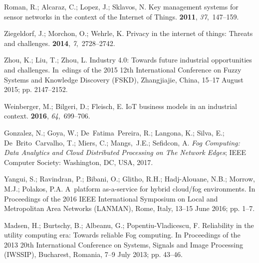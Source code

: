 \documentclass[symmetry,article,accept,moreauthors,pdftex10pt,a4paper]{mdpi}
\begin{document}
\begin{thebibliography}{999}
Roman, R.; Alcaraz, C.; Lopez, J.; Sklavos, N.
\newblock Key management systems for sensor networks in the context of the
Internet of Things.
 {\bf 2011}, {\em 37},~147--159.

Ziegeldorf, J.; Morchon, O.; Wehrle, K.
\newblock Privacy in the internet of things: Threats and challenges.
 {\bf 2014}, {\em
	7},~2728--2742.

Zhou, K.; Liu, T.; Zhou, L.
\newblock Industry 4.0: Towards future industrial opportunities and challenges.
\newblock In~edings of the 2015 12th International Conference on Fuzzy Systems and Knowledge
Discovery (FSKD),  Zhangjiajie, China, 15--17 August 2015; pp. 2147--2152.

Weinberger, M.; Bilgeri, D.; Fleisch, E.
\newblock IoT business models in an industrial context.
 {\bf 2016}, {\em 64},~699--706.

Gonzalez, N.; Goya, W.; De~Fatima~Pereira, R.; Langona, K.; Silva, E.;
De~Brito~Carvalho, T.; Miers, C.; Mangs,~J.E.; Sefidcon, A.
\newblock \emph{Fog Computing: Data Analytics and Cloud Distributed Processing on The
	Network Edges};
\newblock IEEE Computer Society: Washington, DC, USA, 2017.

Yangui, S.; Ravindran, P.; Bibani, O.; Glitho, R.H.; Hadj-Alouane, N.B.;
Morrow, M.J.; Polakos, P.A.
\newblock A~platform as-a-service for hybrid cloud/fog environments.
\newblock In Proceedings of the 2016 IEEE International Symposium on Local and Metropolitan Area
Networks (LANMAN), Rome, Italy, 13--15 June 2016; pp. 1--7.

Madsen, H.; Burtschy, B.; Albeanu, G.; Popentiu-Vladicescu, F.
\newblock Reliability in the utility computing era: Towards reliable Fog
computing.
\newblock In Proceedings of the 2013 20th International Conference on Systems, Signals and Image
Processing (IWSSIP), Bucharest, Romania, 7--9 July 2013; pp. 43--46.


\end{thebibliography}
\end{document}
